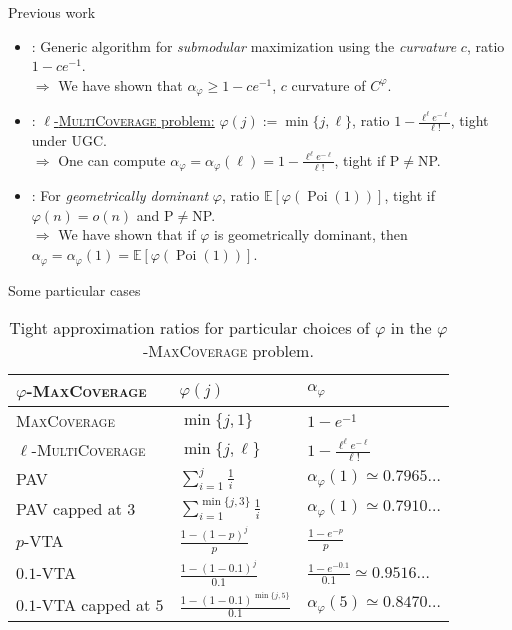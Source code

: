 \documentclass{beamer}
\theoremstyle{definition}
\theoremstyle{remark}
\DeclareMathOperator{\Poi}{\text{Poi}}
\begin{document}
\begin{frame}{Previous work}
  \begin{itemize}
  \item \cite{SVW17}: Generic algorithm for \emph{submodular} maximization using the \emph{curvature} $c$, ratio $1-ce^{-1}$.\\
  $\Rightarrow$ We have shown that $\alpha_{\varphi} \geq 1-ce^{-1}$, $c$ curvature of $C^{\varphi}$.
    \pause
    \bigskip
  \item \cite{BFGG20}: \underline{$\ell$-\textsc{MultiCoverage} problem:} $\varphi(j):=\min\{ j,\ell\}$, ratio $1-\frac{\ell^{\ell}e^{-\ell}}{\ell!}$, tight under UGC.\\
  $\Rightarrow$ One can compute $\alpha_{\varphi} = \alpha_{\varphi}(\ell) = 1-\frac{\ell^{\ell}e^{-\ell}}{\ell!}$, tight if \textrm{P}$\not=$\textrm{NP}.
    \pause
    \bigskip
  \item \cite{DMMS20}: For \emph{geometrically dominant} $\varphi$, ratio $\mathbb{E}[\varphi(\Poi(1))]$, tight if $\varphi(n) = o(n)$ and \textrm{P}$\not=$\textrm{NP}.\\
  $\Rightarrow$ We have shown that if $\varphi$ is geometrically dominant, then $\alpha_\varphi=\alpha_\varphi(1)=\mathbb{E}[\varphi(\Poi(1))]$.
  \end{itemize}
\end{frame}

\begin{frame}{Some particular cases}
  \begin{table}[!h]
  \begin{center}
    \begin{tabular}{|l|l|l|}
      \hline
      $\varphi$-\textsc{MaxCoverage}  & $\varphi(j)$ & $\alpha_{\varphi}$ \\
      \hline
      \textsc{MaxCoverage} & $\min \{ j,1\}$ & $1 - e^{-1}$  \\
      $\ell$-\textsc{MultiCoverage} & $\min\{ j,\ell\}$ & $1-\frac{\ell^{\ell}e^{-\ell}}{\ell!}$ \\
       \textsc{PAV} & $\sum_{i=1}^j \frac{1}{i}$ & $\alpha_{\varphi}(1) \simeq 0.7965\ldots$\\
      \textsc{PAV} capped at $3$ & $\sum_{i=1}^{\min\{j,3\}} \frac{1}{i}$ & $\alpha_{\varphi}(1) \simeq 0.7910\ldots$ \\
      $p$-\textsc{VTA} & $\frac{1-(1-p)^j}{p}$ & $\frac{1 - e^{-p}}{p}$  \\
      $0.1$-\textsc{VTA} & $\frac{1-(1-0.1)^j}{0.1}$ & $\frac{1 - e^{-0.1}}{0.1} \simeq 0.9516\ldots$ \\
      $0.1$-\textsc{VTA} capped at $5$ & $\frac{1-(1-0.1)^{\min\{j,5\}}}{0.1}$ & $\alpha_{\varphi}(5) \simeq 0.8470\ldots$  \\
      \hline
    \end{tabular}
  \end{center}
  \caption{Tight approximation ratios for particular choices of $\varphi$ in the $\varphi$-\textsc{MaxCoverage} problem.}
  \label{figComp}
\end{table}
\end{frame}
\end{document}
